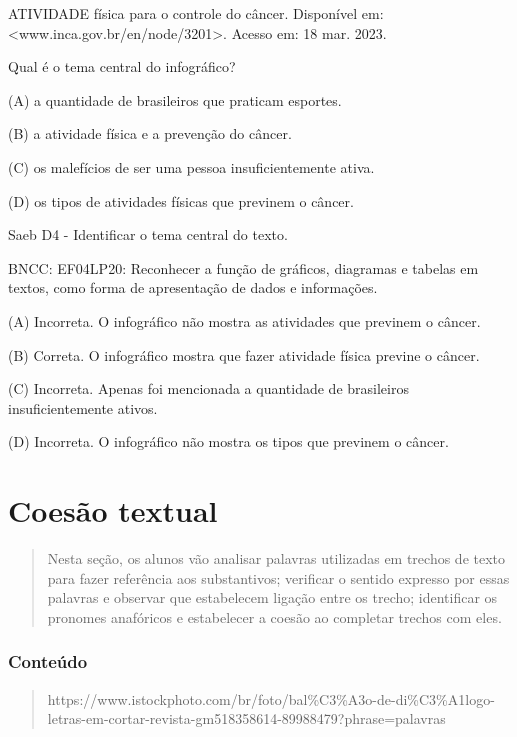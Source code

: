 \begin{itemize}
{{{\begin{itemize}
\begin{itemize}
\begin{itemize}
\protect\hypertarget{_Hlk40547643}{}{}

ATIVIDADE física para o controle do câncer. Disponível em:
\textless{}www.inca.gov.br/en/node/3201\textgreater{}. Acesso em: 18
mar. 2023.

Qual é o tema central do infográfico?

(A) a quantidade de brasileiros que praticam esportes.

(B) a atividade física e a prevenção do câncer.

(C) os malefícios de ser uma pessoa insuficientemente ativa.

(D) os tipos de atividades físicas que previnem o câncer.

Saeb D4 - Identificar o tema central do texto.

BNCC: EF04LP20: Reconhecer a função de gráficos, diagramas e tabelas em
textos, como forma de apresentação de dados e informações.

(A) Incorreta. O infográfico não mostra as atividades que previnem o
câncer.

(B) Correta. O infográfico mostra que fazer atividade física previne o
câncer.

(C) Incorreta. Apenas foi mencionada a quantidade de brasileiros
insuficientemente ativos.

(D) Incorreta. O infográfico não mostra os tipos que previnem o câncer.

\chapter{Coesão textual}

\begin{quote}
Nesta seção, os alunos vão analisar palavras utilizadas em trechos de
texto para fazer referência aos substantivos; verificar o sentido
expresso por essas palavras e observar que estabelecem ligação entre os
trecho; identificar os pronomes anafóricos e estabelecer a coesão ao
completar trechos com eles.
\end{quote}

\subsection{Conteúdo}\label{conteuxfado-9}

\begin{quote}
https://www.istockphoto.com/br/foto/bal\%C3\%A3o-de-di\%C3\%A1logo-letras-em-cortar-revista-gm518358614-89988479?phrase=palavras


\end{quote}
\end{itemize}
\end{itemize}
\end{itemize}}}}
\end{itemize}
